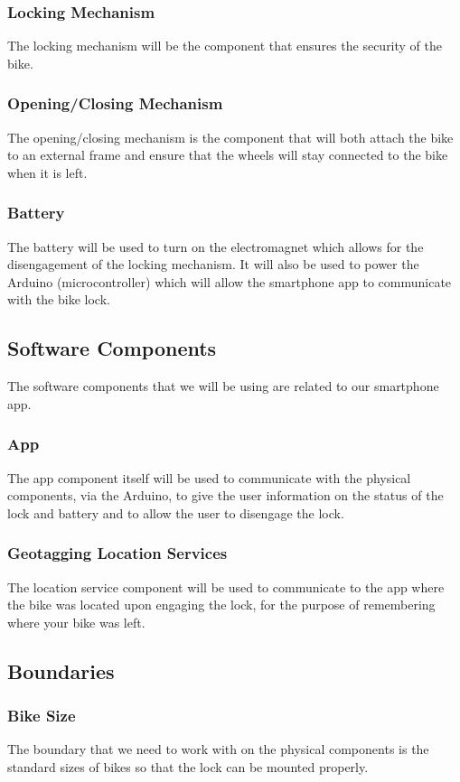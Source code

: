 \documentclass{article}
\begin{document}
\subsubsection{Locking Mechanism}
The locking mechanism will be the component that ensures the security of the bike.
\subsubsection{Opening/Closing Mechanism}
The opening/closing mechanism is the component that will both attach the bike to an external frame and ensure that the wheels will stay connected to the bike when it is left.
\subsubsection{Battery}
The battery will be used to turn on the electromagnet which allows for the disengagement of the locking mechanism.  It will also be used to power the Arduino (microcontroller) which will allow the smartphone app to communicate with the bike lock.
\subsection {Software Components}
The software components that we will be using are related to our smartphone app.
\subsubsection {App}
The app component itself will be used to communicate with the physical components, via the Arduino, to give the user information on the status of the lock and battery and to allow the user to disengage the lock. 
\subsubsection {Geotagging Location Services}
The location service component will be used to communicate to the app where the bike was located upon engaging the lock, for the purpose of remembering where your bike was left.
\subsection {Boundaries}
\subsubsection{Bike Size}
The boundary that we need to work with on the physical components is the standard sizes of bikes so that the lock can be mounted properly.
\end{document}
